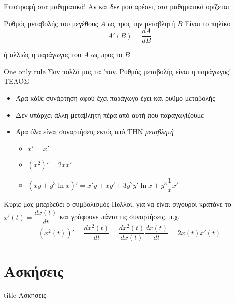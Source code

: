 \documentclass{presentation}
\begin{document}
\begin{frame}{Επιστροφή στα μαθηματικά!}
  Αν και δεν μου αρέσει, στα μαθηματικά ορίζεται
  \begin{block}{Ρυθμός μεταβολής του μεγέθους $A$ ως προς την μεταβλητή $B$}
    Είναι το πηλίκο
    $$Α'(Β)=\frac{dA}{dΒ}$$
  \end{block}
  ή αλλιώς η παράγωγος του $Α$ ως προς το $Β$
\end{frame}

\begin{frame}{One only rule}
  Σαν πολλά μας τα 'παν. Ρυθμός μεταβολής είναι η παράγωγος! ΤΕΛΟΣ
  \begin{itemize}
    \item<2-> Άρα κάθε συνάρτηση αφού έχει παράγωγο έχει και ρυθμό μεταβολής
    \item<3-> Δεν υπάρχει άλλη μεταβλητή πέρα από αυτή που παραγωγίζουμε
    \item<4-> Άρα όλα είναι συναρτήσεις εκτός από ΤΗΝ \emph{μεταβλητή}
          \begin{itemize}
            \item<5-> $x'=x'$
            \item<6-> $(x^2)'=2xx'$
            \item<7-> $(xy+y^3\ln x)'=x'y+xy'+3y^2y'\ln x+y^3\dfrac{1}{x}x'$
          \end{itemize}
  \end{itemize}
\end{frame}

\begin{frame}{Κύριε μας μπερδεύει ο συμβολισμός}
  Πολλοί, για να είναι σίγουροι κρατάνε το $x'(t)=\dfrac{dx(t)}{dt}$ και γράφουνε πάντα τις συναρτήσεις. π.χ.
  $$(x^2(t))'=\frac{dx^2(t)}{dt}=\frac{dx^2(t)}{dx(t)}\frac{dx(t)}{dt}=2x(t)x'(t)$$
\end{frame}


\section{Ασκήσεις}

\begin{frame}[noframenumbering]
  \vfill
  \centering
  \begin{beamercolorbox}[sep=8pt,center,shadow=true,rounded=true]{title}
    Ασκήσεις
  \end{beamercolorbox}
  \vfill
\end{frame}
\end{document}
